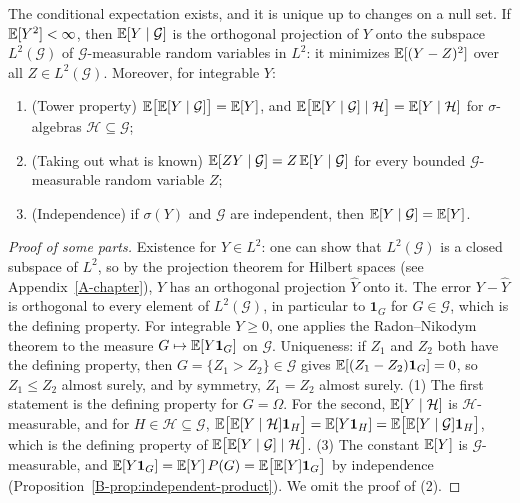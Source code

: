 \begin{theorem}\label{B-thm:conditional-expectation-general}
    The conditional expectation exists, and it is unique up to changes on a null set. If $\mathbb{E}[Y^2] < \infty$, then $\mathbb{E}[Y \mid \mathcal{G}]$ is the orthogonal projection of $Y$ onto the subspace $L^2(\mathcal{G})$ of $\mathcal{G}$-measurable random variables in $L^2$: it minimizes $\mathbb{E}[(Y - Z)^2]$ over all $Z \in L^2(\mathcal{G})$. Moreover, for integrable $Y$:
    \begin{enumerate}
        \item (Tower property) $\mathbb{E}\big[\mathbb{E}[Y \mid \mathcal{G}]\big] = \mathbb{E}[Y]$, and $\mathbb{E}\big[\mathbb{E}[Y \mid \mathcal{G}] \mid \mathcal{H}\big] = \mathbb{E}[Y \mid \mathcal{H}]$ for $\sigma$-algebras $\mathcal{H} \subseteq \mathcal{G}$;
        \item (Taking out what is known) $\mathbb{E}[ZY \mid \mathcal{G}] = Z\,\mathbb{E}[Y \mid \mathcal{G}]$ for every bounded $\mathcal{G}$-measurable random variable $Z$;
        \item (Independence) if $\sigma(Y)$ and $\mathcal{G}$ are independent, then $\mathbb{E}[Y \mid \mathcal{G}] = \mathbb{E}[Y]$.
    \end{enumerate}
\end{theorem}

\begin{proof}[Proof of some parts]
    Existence for $Y \in L^2$: one can show that $L^2(\mathcal{G})$ is a closed subspace of $L^2$, so by the projection theorem for Hilbert spaces (see Appendix~\ref{A-chapter}), $Y$ has an orthogonal projection $\hat Y$ onto it. The error $Y - \hat Y$ is orthogonal to every element of $L^2(\mathcal{G})$, in particular to $\mathbf{1}_G$ for $G \in \mathcal{G}$, which is the defining property. For integrable $Y \geq 0$, one applies the Radon--Nikodym theorem to the measure $G \mapsto \mathbb{E}[Y\mathbf{1}_G]$ on $\mathcal{G}$. Uniqueness: if $Z_1$ and $Z_2$ both have the defining property, then $G = \{Z_1 > Z_2\} \in \mathcal{G}$ gives $\mathbb{E}[(Z_1 - Z_2)\mathbf{1}_G] = 0$, so $Z_1 \leq Z_2$ almost surely, and by symmetry, $Z_1 = Z_2$ almost surely. (1) The first statement is the defining property for $G = \Omega$. For the second, $\mathbb{E}[Y \mid \mathcal{H}]$ is $\mathcal{H}$-measurable, and for $H \in \mathcal{H} \subseteq \mathcal{G}$, $\mathbb{E}\big[\mathbb{E}[Y \mid \mathcal{H}]\mathbf{1}_H\big] = \mathbb{E}[Y\mathbf{1}_H] = \mathbb{E}\big[\mathbb{E}[Y \mid \mathcal{G}]\mathbf{1}_H\big]$, which is the defining property of $\mathbb{E}\big[\mathbb{E}[Y \mid \mathcal{G}] \mid \mathcal{H}\big]$. (3) The constant $\mathbb{E}[Y]$ is $\mathcal{G}$-measurable, and $\mathbb{E}[Y\mathbf{1}_G] = \mathbb{E}[Y]\,P(G) = \mathbb{E}\big[\mathbb{E}[Y]\mathbf{1}_G\big]$ by independence (Proposition~\ref{B-prop:independent-product}). We omit the proof of (2).
\end{proof}

